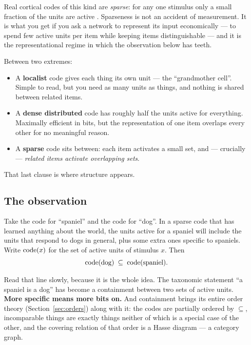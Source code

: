 \noindent
Real cortical codes of this kind are \emph{sparse}: for any one stimulus only
a small fraction of the units are active \citep{barlow1972,foldiak1990,%
olshausen1996}. Sparseness is not an accident of measurement. It is what you
get if you ask a network to represent its input economically --- to spend few
active units per item while keeping items distinguishable --- and it is the
representational regime in which the observation below has teeth.

Between two extremes:

\begin{itemize}[leftmargin=1.4em]
\item A \textbf{localist} code gives each thing its own unit --- the
  ``grandmother cell''. Simple to read, but you need as many units as things,
  and nothing is shared between related items.
\item A \textbf{dense distributed} code has roughly half the units active for
  everything. Maximally efficient in bits, but the representation of one item
  overlaps every other for no meaningful reason.
\item A \textbf{sparse} code sits between: each item activates a small set,
  and --- crucially --- \emph{related items activate overlapping sets}.
\end{itemize}

That last clause is where structure appears.

\subsection{The observation}

Take the code for ``spaniel'' and the code for ``dog''. In a sparse code that
has learned anything about the world, the units active for a spaniel will
include the units that respond to dogs in general, plus some extra ones
specific to spaniels. Write $\mathrm{code}(x)$ for the set of active units of
stimulus $x$. Then
\[
  \mathrm{code}(\text{dog}) \;\subseteq\; \mathrm{code}(\text{spaniel}) .
\]

Read that line slowly, because it is the whole idea. The taxonomic statement
``a spaniel is a dog'' has become a containment between two sets of active
units. \textbf{More specific means more bits on.} And containment brings its
entire order theory (Section~\ref{sec:orders}) along with it: the codes are
partially ordered by $\subseteq$, incomparable things are exactly things
neither of which is a special case of the other, and the covering relation of
that order is a Hasse diagram --- a category graph.

